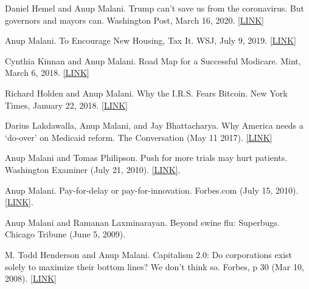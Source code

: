 \documentclass[11pt,letterpaper]{report}
\begin{document}
\begin{tablist}
        \item[2020] \tab{}Daniel Hemel and Anup Malani.  Trump can’t save us from the coronavirus. But governors and mayors can.  Washington Post, March 16, 2020.  \href{https://www.washingtonpost.com/outlook/2020/03/16/governors-mayors-emergency-powers-coronavirus/}{[LINK]}
        
        \item[2019] \tab{}Anup Malani. To Encourage New Housing, Tax It.  WSJ, July 9, 2019. \href{https://www.wsj.com/articles/to-encourage-new-housing-tax-it-11562526409}{[LINK]}
        
        \item[2018] \tab{}Cynthia Kinnan and Anup Malani.  Road Map for a Successful Modicare.  Mint, March 6, 2018. \href{https://www.livemint.com/Opinion/enERYnZY3MVuxvCzMpEuiJ/Road-map-for-a-successful-Modicare.html}{[LINK]}
        
        \item[2018] \tab{}Richard Holden and Anup Malani.  Why the I.R.S. Fears Bitcoin.  New York Times, January 22, 2018. \href{https://www.nytimes.com/2018/01/22/opinion/irs-bitcoin-fear.html}{[LINK]}
        
        \item[2017] \tab{}Darius Lakdawalla, Anup Malani, and Jay Bhattacharya.  Why America needs a ‘do-over’ on Medicaid reform.  The Conversation (May 11 2017).  \href{https://theconversation.com/why-america-needs-a-do-over-on-medicaid-reform-75524?sa=pg2&sq=Malani&sr=2}{[LINK]}
        
        \item[2010] \tab{}Anup Malani and Tomas Philipson.  Push for more trials may hurt patients.  Washington Examiner (July 21, 2010).  \href{http://www.washingtonexaminer.com/opinion/columns/Push-for-more-clinical-trials-may-hurt-patients-1002114-98875969.html}{[LINK]}.
        
        \item[2010] \tab{}Anup Malani.  Pay-for-delay or pay-for-innovation.  Forbes.com (July 15, 2010).  \href{http://www.forbes.com/2010/07/15/drug-patents-pharmaceuticals-opinions-contributors-anup-malani_2.html}{[LINK]}.
        
        \item[2009] \tab{}Anup Malani and Ramanan Laxminarayan.  Beyond swine flu: Superbugs.  Chicago Tribune (June 5, 2009).
        
        \item[2008] \tab{}M. Todd Henderson and Anup Malani. Capitalism 2.0: Do corporations exist solely to maximize their bottom lines? We don’t think so.  Forbes, p 30 (Mar 10, 2008). \href{https://www.forbes.com/forbes/2008/0310/030.html}{[LINK]}

    \end{tablist}
\end{document}

